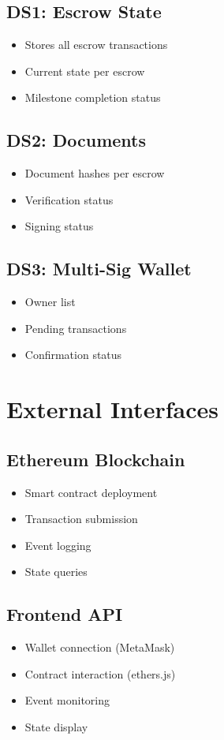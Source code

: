 \documentclass[12pt,a4paper]{article}
\begin{document}
\subsection{DS1: Escrow State}
\begin{itemize}
\item Stores all escrow transactions
\item Current state per escrow
\item Milestone completion status
\end{itemize}

\subsection{DS2: Documents}
\begin{itemize}
\item Document hashes per escrow
\item Verification status
\item Signing status
\end{itemize}

\subsection{DS3: Multi-Sig Wallet}
\begin{itemize}
\item Owner list
\item Pending transactions
\item Confirmation status
\end{itemize}

\section{External Interfaces}

\subsection{Ethereum Blockchain}
\begin{itemize}
\item Smart contract deployment
\item Transaction submission
\item Event logging
\item State queries
\end{itemize}

\subsection{Frontend API}
\begin{itemize}
\item Wallet connection (MetaMask)
\item Contract interaction (ethers.js)
\item Event monitoring
\item State display
\end{itemize}
\end{document}
